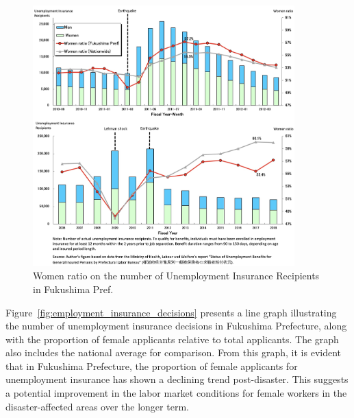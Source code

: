 \documentclass[a4paper,12pt]{article}
\begin{document}
\begin{figure}[h!]
    \centering
    \includegraphics[width=0.9\textwidth]{Number of Actual Unemployment Insurance Recipients2.jpeg}  %
    \caption{Women ratio on the number of Unemployment Insurance Recipients in Fukushima Pref.}
    \label{fig:women_ratio_fukushima2}
\end{figure}


Figure~\ref{fig:employment_insurance_decisions} presents a line graph illustrating the number of unemployment insurance decisions in Fukushima Prefecture, along with the proportion of female applicants relative to total applicants. The graph also includes the national average for comparison. From this graph, it is evident that in Fukushima Prefecture, the proportion of female applicants for unemployment insurance has shown a declining trend post-disaster. This suggests a potential improvement in the labor market conditions for female workers in the disaster-affected areas over the longer term.
\end{document}
